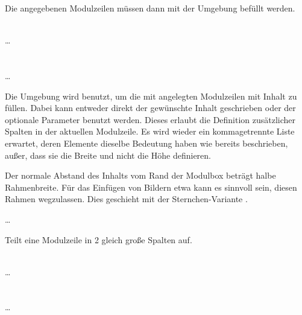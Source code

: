 Die angegebenen Modulzeilen müssen dann mit der Umgebung 
befüllt werden.

\begin{Declaration}
    \\%
  \quad\dots\\
  \\
    \\%
  \quad\dots\\
\end{Declaration}

Die Umgebung  wird benutzt,
um die mit  angelegten Modulzeilen mit Inhalt zu füllen.
Dabei kann entweder direkt der gewünschte Inhalt geschrieben oder der optionale
Parameter  benutzt werden.
Dieses erlaubt die Definition zusätzlicher Spalten in der aktuellen Modulzeile.
Es wird wieder ein kommagetrennte Liste erwartet,
deren Elemente dieselbe Bedeutung haben wie bereits beschrieben, außer, dass
sie die Breite und nicht die Höhe definieren.

Der normale Abstand des Inhalts vom Rand der Modulbox beträgt halbe
Rahmenbreite. Für das Einfügen von Bildern etwa kann es sinnvoll sein,
diesen Rahmen wegzulassen.
Dies geschieht mit der Sternchen-Variante .


\begin{minipage}{0.6\textwidth}
\begin{Example}\par
  \noindent{}
    \par
  \quad\dots\\
  \bigskip\par
  \noindent Teilt eine Modulzeile in 2 gleich große Spalten auf.
\end{Example}
\end{minipage}
\hfill
\begin{minipage}{0.3\textwidth}\centering
\end{minipage}

\begin{Declaration}
    \\%
  \quad\dots\\
  \\
    \\%
  \quad\dots\\
\end{Declaration}

